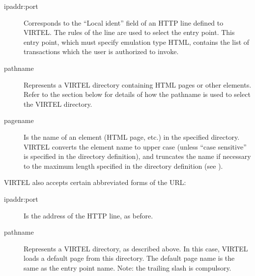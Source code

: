 \documentclass[letterpaper,10pt,english]{sphinxmanual}
\begin{document}
\begin{sphinxVerbatim}[commandchars=\\\{\}]
\end{sphinxVerbatim}
\begin{description}
\item[{ipaddr:port}] \leavevmode
Corresponds to the “Local ident” field of an HTTP line defined to
VIRTEL. The rules of the line are used to select the entry point.
This entry point, which must specify emulation type HTML, contains
the list of transactions which the user is authorized to invoke.

\item[{pathname}] \leavevmode
Represents a VIRTEL directory containing HTML pages or other elements. Refer to the section {\hyperref[\detokenize{User_Guide:v457ug-how-the-path-name}]{}} below for details of how the pathname is used to select the VIRTEL directory.

\item[{pagename}] \leavevmode
Is the name of an element (HTML page, etc.) in the specified
directory. VIRTEL converts the element name to upper case (unless
“case sensitive” is specified in the directory definition), and
truncates the name if necessary to the maximum length specified in
the directory definition (see {\hyperref[\detokenize{User_Guide:v457ug-directory-management}]{}}).

\end{description}

VIRTEL also accepts certain abbreviated forms of the URL:

\begin{sphinxVerbatim}[commandchars=\\\{\}]
\end{sphinxVerbatim}
\begin{description}
\item[{ipaddr:port}] \leavevmode
Is the address of the HTTP line, as before.

\item[{pathname}] \leavevmode
Represents a VIRTEL directory, as described above. In this case, VIRTEL loads a default page from this directory. The default page name is the same as the entry point name. Note: the trailing slash is compulsory.

\end{description}
\end{document}
